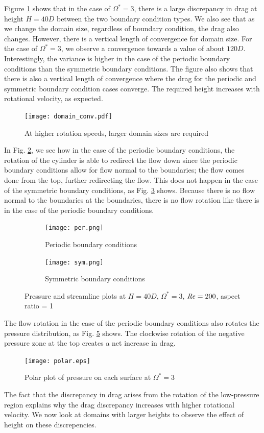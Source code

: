 Figure \ref{fig:domain_conv} shows that in the case of $\Omega^{\ast} = 3$, there is a large discrepancy in drag at height $H = 40D$ between the two boundary condition types. We also see that as we change the domain size, regardless of boundary condition, the drag also changes.  However, there is a vertical length of convergence for domain size. For the case of $\Omega^{\ast} = 3$, we observe a convergence towards a value of about $120D$. Interestingly, the variance is higher in the case of the periodic boundary conditions than the symmetric boundary conditions. The figure also shows that there is also a vertical length of convergence where the drag for the periodic and symmetric boundary condition cases converge. The required height increases with rotational velocity, as expected. 
\begin{figure}
    \centerline{\texttt{[image: domain\_conv.pdf]}}
    \caption{At higher rotation speeds, larger domain sizes are required}
    \label{fig:domain_conv}
\end{figure}
In Fig. \ref{fig:per}, we see how in the case of the periodic boundary conditions, the rotation of the cylinder is able to redirect the flow down since the periodic boundary conditions allow for flow normal to the boundaries; the flow comes done from the top, further redirecting the flow. This does not happen in the case of the symmetric boundary conditions, as Fig. \ref{fig:sym} shows. Because there is no flow normal to the boundaries at the boundaries, there is no flow rotation like there is in the case of the periodic boundary conditions. 
\begin{figure}
    \centering
    \begin{subfigure}{0.49\textwidth}
    \texttt{[image: per.png]}
    \caption{Periodic boundary conditions}
    \label{fig:per}
    \end{subfigure}
    \begin{subfigure}{0.49\textwidth}
    \texttt{[image: sym.png]}
    \caption{Symmetric boundary conditions}
    \label{fig:sym}
    \end{subfigure}
    \caption{Pressure and streamline plots at $H = 40D$, $\Omega^{\ast} = 3$, $\mathit{Re} = 200$, aspect ratio = 1}
    \label{fig:per sym}
\end{figure}
The flow rotation in the case of the periodic boundary conditions also rotates the pressure distribution, as Fig. \ref{fig:polar pres} shows. The clockwise rotation of the negative pressure zone at the top creates a net increase in drag.
\begin{figure}
    \centerline{\texttt{[image: polar.eps]}}
    \caption{Polar plot of pressure on each surface at $\Omega^{\ast} = 3$}
    \label{fig:polar pres}
\end{figure}
The fact that the discrepancy in drag arises from the rotation of the low-pressure region explains why the drag discrepancy increases with higher rotational velocity. We now look at domains with larger heights to observe the effect of height on these discrepencies.

